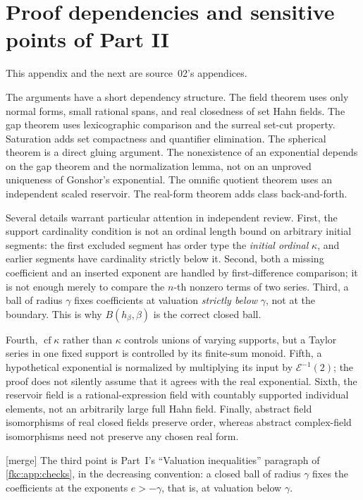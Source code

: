 \documentclass[11pt,letterpaper]{article}
\numberwithin{equation}{section}
\theoremstyle{definition}
\theoremstyle{remark}
\newcommand{\cf}{\operatorname{cf}}
\newcommand{\mergetag}{\textup{\textsf{\small[merge]}}}%
\begin{document}
\section{Proof dependencies and sensitive points of Part II}\label{fkc:sb:app:audit}

This appendix and the next are source~02's appendices.

The arguments have a short dependency structure. The field theorem uses only normal forms, small rational spans, and real closedness of set Hahn fields. The gap theorem uses lexicographic comparison and the surreal set-cut property. Saturation adds set compactness and quantifier elimination. The spherical theorem is a direct gluing argument. The nonexistence of an exponential depends on the gap theorem and the normalization lemma, not on an unproved uniqueness of Gonshor's exponential. The omnific quotient theorem uses an independent scaled reservoir. The real-form theorem adds class back-and-forth.

Several details warrant particular attention in independent review. First, the support cardinality condition is not an ordinal length bound on arbitrary initial segments: the first excluded segment has order type the \emph{initial ordinal} $\kappa$, and earlier segments have cardinality strictly below it. Second, both a missing coefficient and an inserted exponent are handled by first-difference comparison; it is not enough merely to compare the $n$-th nonzero terms of two series. Third, a ball of radius $\gamma$ fixes coefficients at valuation \emph{strictly below} $\gamma$, not at the boundary. This is why $B(h_\beta,\beta)$ is the correct closed ball.

Fourth, $\cf\kappa$ rather than $\kappa$ controls unions of varying supports, but a Taylor series in one fixed support is controlled by its finite-sum monoid. Fifth, a hypothetical exponential is normalized by multiplying its input by $\mathcal E^{-1}(2)$; the proof does not silently assume that it agrees with the real exponential. Sixth, the reservoir field is a rational-expression field with countably supported individual elements, not an arbitrarily large full Hahn field. Finally, abstract field isomorphisms of real closed fields preserve order, whereas abstract complex-field isomorphisms need not preserve any chosen real form.

\mergetag{} The third point is Part~I's ``Valuation inequalities'' paragraph of \cref{fkc:app:checks}, in the decreasing convention: a closed ball of radius $\gamma$ fixes the coefficients at the exponents $e>-\gamma$, that is, at valuation below $\gamma$.
\end{document}
